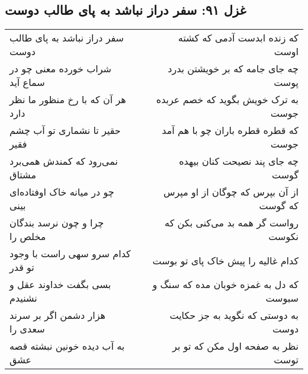 \begin{center}
\section*{غزل ۹۱: سفر دراز نباشد به پای طالب دوست}
\label{sec:091}
\begin{longtable}{l p{0.5cm} r}
سفر دراز نباشد به پای طالب دوست
&&
که زنده ابدست آدمی که کشته اوست
\\
شراب خورده معنی چو در سماع آید
&&
چه جای جامه که بر خویشتن بدرد پوست
\\
هر آن که با رخ منظور ما نظر دارد
&&
به ترک خویش بگوید که خصم عربده جوست
\\
حقیر تا نشماری تو آب چشم فقیر
&&
که قطره قطره باران چو با هم آمد جوست
\\
نمی‌رود که کمندش همی‌برد مشتاق
&&
چه جای پند نصیحت کنان بیهده گوست
\\
چو در میانه خاک اوفتاده‌ای بینی
&&
از آن بپرس که چوگان از او مپرس که گوست
\\
چرا و چون نرسد بندگان مخلص را
&&
رواست گر همه بد می‌کنی بکن که نکوست
\\
کدام سرو سهی راست با وجود تو قدر
&&
کدام غالیه را پیش خاک پای تو بوست
\\
بسی بگفت خداوند عقل و نشنیدم
&&
که دل به غمزه خوبان مده که سنگ و سبوست
\\
هزار دشمن اگر بر سرند سعدی را
&&
به دوستی که نگوید به جز حکایت دوست
\\
به آب دیده خونین نبشته قصه عشق
&&
نظر به صفحه اول مکن که تو بر توست
\\
\end{longtable}
\end{center}
